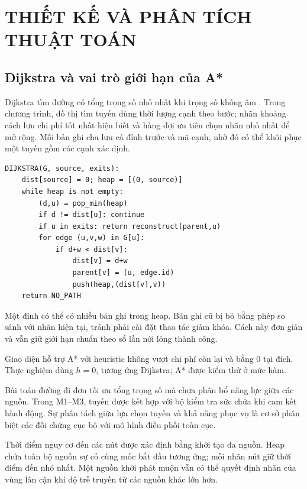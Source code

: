 \clearpage\section{THIẾT KẾ VÀ PHÂN TÍCH THUẬT TOÁN}
\subsection{Dijkstra và vai trò giới hạn của A*}
Dijkstra tìm đường có tổng trọng số nhỏ nhất khi trọng số không âm \cite{dijkstra}. Trong chương trình, đồ thị tìm tuyến dùng thời lượng cạnh theo bước; nhãn khoảng cách lưu chi phí tốt nhất hiện biết và hàng đợi ưu tiên chọn nhãn nhỏ nhất để mở rộng. Mỗi bản ghi cha lưu cả đỉnh trước và mã cạnh, nhờ đó có thể khôi phục một tuyến gồm các cạnh xác định.

\begin{algorithm}[htbp]\caption{Tìm tuyến ngắn nhất tới một tập đích}\label{alg:1}
\begin{lstlisting}[frame=none]
DIJKSTRA(G, source, exits):
    dist[source] = 0; heap = [(0, source)]
    while heap is not empty:
        (d,u) = pop_min(heap)
        if d != dist[u]: continue
        if u in exits: return reconstruct(parent,u)
        for edge (u,v,w) in G[u]:
            if d+w < dist[v]:
                dist[v] = d+w
                parent[v] = (u, edge.id)
                push(heap,(dist[v],v))
    return NO_PATH
\end{lstlisting}
\end{algorithm}
Một đỉnh có thể có nhiều bản ghi trong heap. Bản ghi cũ bị bỏ bằng phép so sánh với nhãn hiện tại, tránh phải cài đặt thao tác giảm khóa. Cách này đơn giản và vẫn giữ giới hạn chuẩn theo số lần nới lỏng thành công.

Giao diện hỗ trợ A* với heuristic không vượt chi phí còn lại và bằng 0 tại đích. Thực nghiệm dùng $h=0$, tương ứng Dijkstra; A* được kiểm thử ở mức hàm.

Bài toán đường đi đơn tối ưu tổng trọng số mà chưa phân bổ năng lực giữa các nguồn. Trong M1--M3, tuyến được kết hợp với bộ kiểm tra sức chứa khi cam kết hành động. Sự phân tách giữa lựa chọn tuyến và khả năng phục vụ là cơ sở phân biệt các đối chứng cục bộ với mô hình điều phối toàn cục.

Thời điểm nguy cơ đến các nút được xác định bằng khởi tạo đa nguồn. Heap chứa toàn bộ nguồn sự cố cùng mốc bắt đầu tương ứng; mỗi nhãn nút giữ thời điểm đến nhỏ nhất. Một nguồn khởi phát muộn vẫn có thể quyết định nhãn của vùng lân cận khi độ trễ truyền từ các nguồn khác lớn hơn.

